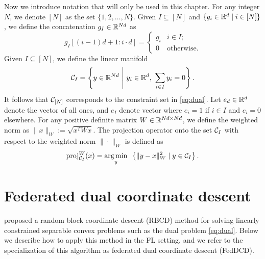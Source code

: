 Now we introduce notation that will only be used in this chapter. For any integer $N$, we denote $[N]$ as the set $\{1,2,\ldots, N\}$. Given $I \subseteq [N]$ and $\{g_i \in \mathbb{R}^d \mid i \in [N]\}$, we define the concatenation $g_I \in \mathbb{R}^{Nd}$ as 
\[
    g_{I}[(i-1)d + 1 : i\cdot d] = 
    \begin{cases} 
      g_i & i \in I ;\\
      0 & \mbox{otherwise} .
    \end{cases}
\]
Given $I \subseteq [N]$, we define the linear manifold 
\[
    \mathcal{C}_I= \left\{y \in\mathbb{R}^{Nd} ~\Bigg|~ y_i\in\mathbb{R}^d, ~\sum_{i\in I}y_i = 0\right\}.
\]
It follows that $\mathcal{C}_{[N]}$ corresponds to the constraint set in \eqref{eq:dual}. Let $e_d \in \mathbb{R}^d$ denote the vector of all ones, and $e_I$ denote vector where $e_i = 1$ if $i \in I$ and $e_i = 0$ elsewhere.  For any positive definite matrix $W\in\mathbb{R}^{Nd\times Nd}$, we define the weighted norm as $\|x\|_W := \sqrt{x^TWx}$. The projection operator onto the set $\mathcal{C}_I$ with respect to the weighted norm $\|\cdot\|_W$ is defined as
\[
    \operatorname{proj}_{\mathcal{C}_I}^{W}(x) = \underset{y}{\textrm{arg}\,{\min}}\enskip \left\{ \|y-x\|_W^2 \mid y \in \mathcal{C}_I \right\}.
\]


\section{Federated dual coordinate descent}
\label{sec:FedDCD}

\citet{necoara2017random} proposed a random block coordinate descent (RBCD) method for solving linearly constrained separable convex problems such as the dual problem \eqref{eq:dual}. Below we describe how to apply this method in the FL setting, and we refer to the specialization of this algorithm as federated dual coordinate descent (FedDCD).

